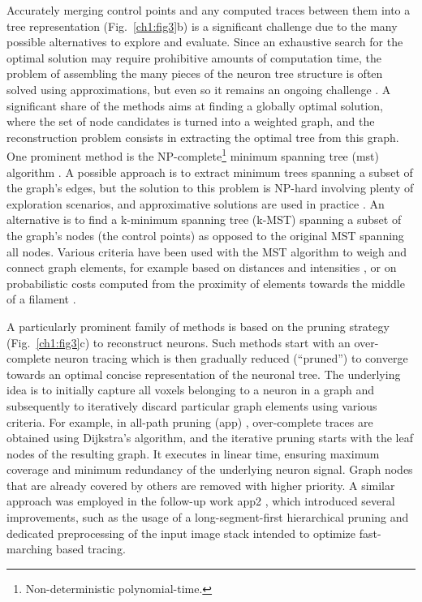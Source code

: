 Accurately merging control points and any computed traces between them into a tree representation (Fig.~\ref{ch1:fig3}b) is a significant challenge due to the many possible alternatives to explore and evaluate. Since an exhaustive search for the optimal solution may require prohibitive amounts of computation time, the problem of assembling the many pieces of the neuron tree structure is often solved using approximations, but even so it remains an ongoing challenge \cite{peng2015bigneuron}. A significant share of the methods aims at finding a globally optimal solution, where the set of node candidates is turned into a weighted graph, and the reconstruction problem consists in extracting the optimal tree from this graph. One prominent method is the NP-complete\footnote{Non-deterministic polynomial-time.} minimum spanning tree (\gls{mst}) algorithm \cite{turetken2011automated, yuan2009mdl, gonzalez2010delineating, xie2010automatic}. A possible approach is to extract minimum trees spanning a subset of the graph's edges, but the solution to this problem is NP-hard \cite{chimani2009obtaining} involving plenty of exploration scenarios, and approximative solutions are used in practice \cite{blum2005combining, gonzalez2010delineating}. An alternative \cite{gonzalez2010delineating, xie2010automatic, turetken2011automated} is to find a k-minimum spanning tree (k-MST) spanning a subset of the graph's nodes (the control points) as opposed to the original MST spanning all nodes. Various criteria have been used with the MST algorithm to weigh and connect graph elements, for example based on distances and intensities \cite{yuan2009mdl}, or on probabilistic costs computed from the proximity of elements towards the middle of a filament \cite{turetken2011automated}. 

A particularly prominent family of methods is based on the pruning strategy (Fig.~\ref{ch1:fig3}c) to reconstruct neurons. Such methods start with an over-complete neuron tracing which is then gradually reduced (``pruned'') to converge towards an optimal concise representation of the neuronal tree. The underlying idea is to initially capture all voxels belonging to a neuron in a graph and subsequently to iteratively discard particular graph elements using various criteria. For example, in all-path pruning (\gls{app}) \cite{peng2011automatic}, over-complete traces are obtained using Dijkstra's algorithm, and the iterative pruning starts with the leaf nodes of the resulting graph. It executes in linear time, ensuring maximum coverage and minimum redundancy of the underlying neuron signal. Graph nodes that are already covered by others are removed with higher priority. A similar approach was employed in the follow-up work \gls{app2} \cite{xiao2013app2}, which introduced several improvements, such as the usage of a long-segment-first hierarchical pruning and dedicated preprocessing of the input image stack intended to optimize fast-marching based tracing.

